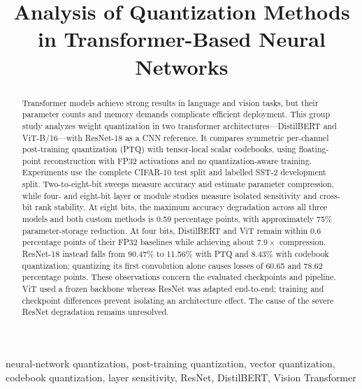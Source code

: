 \documentclass[conference]{IEEEtran}
\begin{document}
\pagestyle{plain}
\raggedbottom

\title{Analysis of Quantization Methods in Transformer-Based Neural Networks}

\author{
}

\maketitle
\thispagestyle{plain}

\begin{abstract}
Transformer models achieve strong results in language and vision tasks, but their parameter counts and memory demands complicate efficient deployment. This group study analyzes weight quantization in two transformer architectures---DistilBERT and ViT-B/16---with ResNet-18 as a CNN reference. It compares symmetric per-channel post-training quantization (PTQ) with tensor-local scalar codebooks, using floating-point reconstruction with FP32 activations and no quantization-aware training. Experiments use the complete CIFAR-10 test split and labelled SST-2 development split. Two-to-eight-bit sweeps measure accuracy and estimate parameter compression, while four- and eight-bit layer or module studies measure isolated sensitivity and cross-bit rank stability. At eight bits, the maximum accuracy degradation across all three models and both custom methods is 0.59 percentage points, with approximately 75\% parameter-storage reduction. At four bits, DistilBERT and ViT remain within 0.6 percentage points of their FP32 baselines while achieving about $7.9\times$ compression. ResNet-18 instead falls from 90.47\% to 11.56\% with PTQ and 8.43\% with codebook quantization; quantizing its first convolution alone causes losses of 60.65 and 78.62 percentage points. These observations concern the evaluated checkpoints and pipeline. ViT used a frozen backbone whereas ResNet was adapted end-to-end; training and checkpoint differences prevent isolating an architecture effect. The cause of the severe ResNet degradation remains unresolved.
\end{abstract}

\begin{IEEEkeywords}
neural-network quantization, post-training quantization, vector quantization, codebook quantization, layer sensitivity, ResNet, DistilBERT, Vision Transformer
\end{IEEEkeywords}
\end{document}
